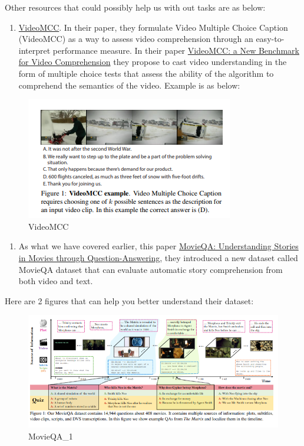 \documentclass{acm_proc_article-sp}
\providecommand{\tightlist}{%
  \setlength{\itemsep}{0pt}\setlength{\parskip}{0pt}}
\begin{document}
Other resources that could possibly help us with out tasks are as below:

\begin{enumerate}
\def\labelenumi{\arabic{enumi}.}
\setcounter{enumi}{2}
\tightlist
\item
  \href{http://videomcc.org/}{VideoMCC}. In their paper, they formulate
  Video Multiple Choice Caption (VideoMCC) as a way to assess video
  comprehension through an easy-to-interpret performance measure. In
  their paper \href{https://arxiv.org/pdf/1606.07373.pdf}{VideoMCC: a
  New Benchmark for Video Comprehension} they propose to cast video
  understanding in the form of multiple choice tests that assess the
  ability of the algorithm to comprehend the semantics of the video.
  Example is as below:
\end{enumerate}

\begin{figure}
\centering
\includegraphics{img/mcc.png}
\caption{VideoMCC}
\end{figure}

\begin{enumerate}
\def\labelenumi{\arabic{enumi}.}
\setcounter{enumi}{3}
\tightlist
\item
  As what we have covered earlier, this paper
  \href{https://arxiv.org/pdf/1512.02902.pdf}{MovieQA: Understanding
  Stories in Movies through Question-Answering}, they introduced a new
  dataset called MovieQA dataset that can evaluate automatic story
  comprehension from both video and text.
\end{enumerate}

Here are 2 figures that can help you better understand their dataset:

\begin{figure}
\centering
\includegraphics{img/movieqa1.png}
\caption{MovieQA\_1}
\end{figure}
\end{document}
